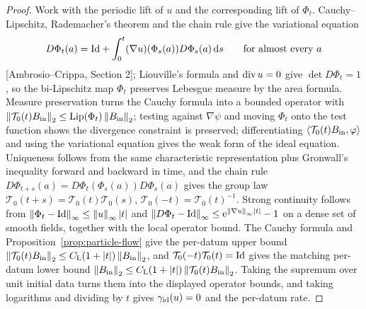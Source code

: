 \begin{proof}
  \leanok
  Work with the periodic lift of $u$ and the corresponding lift of $\Phi_t$.  Cauchy--Lipschitz, Rademacher's theorem and the chain rule
  give the variational equation
  \begin{equation}
    D\Phi_t(a)=\mathrm{Id}+\int_0^t(\nabla u)(\Phi_s(a))D\Phi_s(a)\,\mathrm{d} s
    \qquad\text{for almost every }a
    \label{eq:dynamics:variational}
  \end{equation}
  [Ambrosio--Crippa, Section 2]; Liouville's formula and $\operatorname{div} u=0 $ give
  $\det D\Phi_t=1 $, so the bi-Lipschitz map $\Phi_t $ preserves Lebesgue measure by the
  area formula.  Measure preservation turns the Cauchy formula into a bounded operator
  with $\left\|\mathcal T_0(t)B_{\rm in}\right\|_2\leq\operatorname{Lip}(\Phi_t)\left\|B_{\rm in}\right\|_2 $;
  testing against $\nabla\psi $ and moving $\Phi_t $ onto the test function shows the
  divergence constraint is preserved; differentiating
  $\left\langle\mathcal T_0(t)B_{\rm in},\varphi\right\rangle $ and using the variational equation gives
  the weak form of the ideal equation.  Uniqueness follows from the same characteristic
  representation plus Gronwall's inequality forward and backward in time, and the chain
  rule $D\Phi_{t+s}(a)=D\Phi_t(\Phi_s(a))D\Phi_s(a) $ gives the group law
  $\mathcal T_0(t+s)=\mathcal T_0(t)\mathcal T_0(s) $, $\mathcal T_0(-t)=\mathcal T_0(t)^{-1} $.
  Strong continuity follows from $\left\|\Phi_t-\mathrm{Id}\right\|_\infty\leq\left\|u\right\|_\infty\left\lvert t\right\rvert $ and
  $\left\|D\Phi_t-\mathrm{Id}\right\|_\infty\leq\mathrm{e}^{\left\|\nabla u\right\|_\infty\left\lvert t\right\rvert}-1 $ on a dense set of
  smooth fields, together with the local operator bound.  The Cauchy formula and
  Proposition~\ref{prop:particle-flow} give the per-datum upper bound
  $\left\|\mathcal T_0(t)B_{\rm in}\right\|_2\leq C_{\rm L}(1+\left\lvert t\right\rvert)\left\|B_{\rm in}\right\|_2 $, and
  $\mathcal T_0(-t)\mathcal T_0(t)=\mathrm{Id} $ gives the matching per-datum lower bound
  $\left\|B_{\rm in}\right\|_2\leq C_{\rm L}(1+\left\lvert t\right\rvert)\left\|\mathcal T_0(t)B_{\rm in}\right\|_2 $.  Taking
  the supremum over unit initial data turns them into the displayed operator bounds, and
  taking logarithms and dividing by $t $ gives $\gamma_{\rm id}(u)=0 $ and the per-datum
  rate.
\end{proof}

